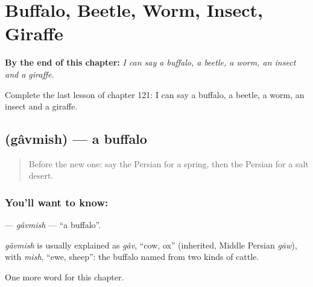 
\chapter{Buffalo, Beetle, Worm, Insect, Giraffe}
\label{ch:fa-buffalo-beetle-worm-insect-giraffe}

\begin{chapteropening}
\textbf{By the end of this chapter:} \emph{I can say a buffalo, a beetle, a worm, an insect and a giraffe.}

Complete the last lesson of chapter 121: I can say a buffalo, a beetle, a worm, an insect and a giraffe.
\end{chapteropening}

\section[\texorpdfstring{\fa{گاومیش} (gâvmish)}{گاومیش (gâvmish)}]{ (gâvmish) — a buffalo}

\label{lesson:FA-C121-gavmish}



\begin{quote}
Before the new one: say the Persian for a spring, then the Persian for a salt desert.
\end{quote}

\subsection*{You'll want to know: }
\textbf{} — \emph{gâvmish} — \textquotedblleft{}a buffalo\textquotedblright{}.

\begin{cousinweb}
\emph{gâvmish} is usually explained as \emph{gâv}, \textquotedblleft{}cow, ox\textquotedblright{} (inherited, Middle Persian \emph{gāw}), with \emph{mish}, \textquotedblleft{}ewe, sheep\textquotedblright{}: the buffalo named from two kinds of cattle.
\end{cousinweb}

\begin{grammarlens}[title={What you've built}]
One more word for this chapter.
\end{grammarlens}


